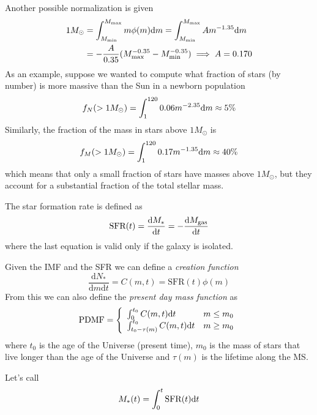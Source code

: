 Another possible normalization is given 
\begin{align*}
     1M_{\odot} &= \int_{M_{\text{min}}}^{M_{\text{max}}}m\phi(m)\text{d}m = \int_{M_{\text{min}}}^{M_{\text{max}}} A m^{-1.35}\text{d}m\\
     &= -\frac{A}{0.35}(M_{\text{max}}^{-0.35}-M_{\text{min}}^{-0.35}) \implies A = 0.170
\end{align*}
As an example, suppose we wanted to compute what fraction of stars (by number) is more massive than the Sun in a newborn population 
\begin{equation*}
    f_{N}(>1M_{\odot}) = \int_{1}^{120}0.06m^{-2.35}\text{d}m \approx 5\%
\end{equation*}
Similarly, the fraction of the mass in stars above $1M_{\odot}$ is 
\begin{equation*}
    f_{M}(>1M_{\odot}) = \int_{1}^{120}0.17m^{-1.35}\text{d}m \approx 40\%
\end{equation*}
which means that only a small fraction of stars have masses above $1M_{\odot}$, but they account for a substantial fraction of the total stellar mass.
\par The star formation rate is defined as 
\begin{equation}
    \text{SFR}(t) = \frac{\text{d}M_{*}}{\text{d}t} = -\frac{\text{d}M_{\text{gas}}}{\text{d}t}
    \label{eq:generalsfr}
\end{equation}
where the last equation is valid only if the galaxy is isolated.
\par Given the IMF and the SFR we can define a \emph{creation function}
\begin{equation}
    \frac{\text{d}N_{*}}{\text{d}m\text{d}t} = C(m,t) = \text{SFR}(t)\phi(m)
    \label{eq:creationfunction}
\end{equation}
From this we can also define the \emph{present day mass function} as
\begin{equation}
    \text{PDMF} = \left\{
        \begin{array}{ll}
            \int_{0}^{t_{0}} C(m,t)\text{d}t & m\leq m_{0}\\
            \int_{t_{0}-\tau(m)}^{t_{0}} C(m,t)\text{d}t & m\geq m_{0}
        \end{array}
        \right.
    \label{eq:pdmf}
\end{equation}
where $t_{0}$ is the age of the Universe (present time), $m_{0}$ is the mass of stars that live longer than the age of the Universe and $\tau(m)$ is the lifetime along the MS.
\par Let's call 
\begin{equation*}
    M_{*}(t) = \int_{0}^{t}\text{SFR}(t)\text{d}t
\end{equation*}
